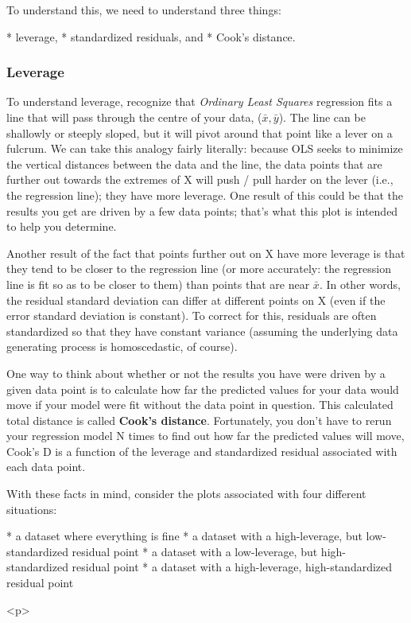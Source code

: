 \documentclass[main.tex]{subfiles}
\begin{document}
To understand this, we need to understand three things:


* leverage,
* standardized residuals, and
* Cook's distance.

\subsubsection{Leverage}
To understand leverage, recognize that \textit{Ordinary Least Squares} regression fits a line that will pass through the centre of your data, ($\bar{x}, \bar{y}$). The line can be shallowly or steeply sloped, but it will pivot around that point like a lever on a fulcrum. We can take this analogy fairly literally: because OLS seeks to minimize the vertical distances between the data and the line, the data points that are further out towards the extremes of X will push / pull harder on the lever (i.e., the regression line); they have more leverage. One result of this could be that the results you get are driven by a few data points; that's what this plot is intended to help you determine.

Another result of the fact that points further out on X have more leverage is that they tend to be closer to the regression line (or more accurately: the regression line is fit so as to be closer to them) than points that are near $\bar{x}$. In other words, the residual standard deviation can differ at different points on X (even if the error standard deviation is constant). To correct for this, residuals are often standardized so that they have constant variance (assuming the underlying data generating process is homoscedastic, of course).

One way to think about whether or not the results you have were driven by a given data point is to calculate how far the predicted values for your data would move if your model were fit without the data point in question. This calculated total distance is called \textbf{Cook's distance}. Fortunately, you don't have to rerun your regression model N times to find out how far the predicted values will move, Cook's D is a function of the leverage and standardized residual associated with each data point.

With these facts in mind, consider the plots associated with four different situations:
\begin{enumerate}
* a dataset where everything is fine
* a dataset with a high-leverage, but low-standardized residual point
* a dataset with a low-leverage, but high-standardized residual point
* a dataset with a high-leverage, high-standardized residual point
\end{enumerate}
<p>
\end{document}
